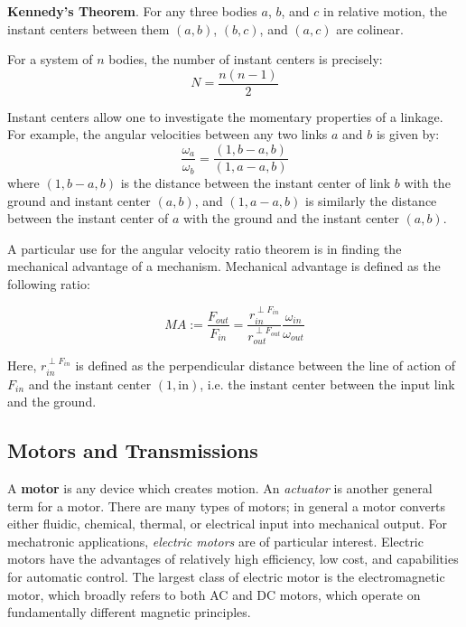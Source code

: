 \textbf{Kennedy's Theorem}. For any three bodies $a$, $b$, and $c$ in relative motion, the instant centers between them $(a,b)$, $(b,c)$, and $(a,c)$ are colinear.

For a system of $n$ bodies, the number of instant centers is precisely: \[N = \frac{n(n-1)}{2}\tag{Number of ICs}\]

Instant centers allow one to investigate the momentary properties of a linkage. For example, the angular velocities between any two links $a$ and $b$ is given by: \[\frac{\omega_a}{\omega_b} = \frac{(1,b - a,b)}{(1,a-a,b)}\] where $(1,b - a,b)$ is the distance between the instant center of link $b$ with the ground and instant center $(a,b)$, and $(1,a-a,b)$ is similarly the distance between the instant center of $a$ with the ground and the instant center $(a,b)$.

A particular use for the angular velocity ratio theorem is in finding the mechanical advantage of a mechanism. Mechanical advantage is defined as the following ratio:

\[MA := \frac{F_{out}}{F_{in}} = \frac{r_{in}^{\perp F_{in}}}{r_{out}^{\perp F_{out}}} \frac{\omega_{in}}{\omega_{out}}\]

Here, $r_{in}^{\perp F_{in}}$ is defined as the perpendicular distance between the line of action of $F_{in}$ and the instant center $(1,\text{in})$, i.e. the instant center between the input link and the ground.

\subsection{Motors and Transmissions}

A \textbf{motor} is any device which creates motion. An \textit{actuator} is another general term for a motor. There are many types of motors; in general a motor converts either fluidic, chemical, thermal, or electrical input into mechanical output. For mechatronic applications, \textit{electric motors} are of particular interest. Electric motors have the advantages of relatively high efficiency, low cost, and capabilities for automatic control. The largest class of electric motor is the electromagnetic motor, which broadly refers to both AC and DC motors, which operate on fundamentally different magnetic principles.

